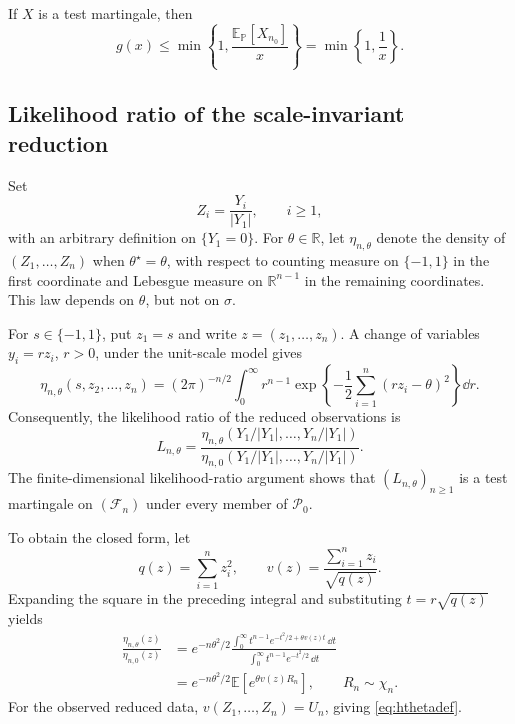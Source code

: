 If \(X\) is a test martingale, then
\[
  g(x)
  \leq
  \min\left\{
    1,
    \frac{\mathbb E_{\mathbb P}[X_{n_0}]}{x}
  \right\}
  =
  \min\left\{1,\frac1x\right\}.
\]


\subsection{Likelihood ratio of the scale-invariant reduction}
\label{app:invariant-likelihood}

Set
\[
  Z_i=\frac{Y_i}{|Y_1|},
  \qquad i\geq1,
\]
with an arbitrary definition on \(\{Y_1=0\}\). For
\(\theta\in\mathbb R\), let \(\eta_{n,\theta}\) denote the density of
\((Z_1,\ldots,Z_n)\) when \(\theta^\star=\theta\), with respect to
counting measure on \(\{-1,1\}\) in the first coordinate and Lebesgue
measure on \(\mathbb R^{n-1}\) in the remaining coordinates. This law
depends on \(\theta\), but not on \(\sigma\).

For \(s\in\{-1,1\}\), put \(z_1=s\) and write
\(z=(z_1,\ldots,z_n)\). A change of variables
\(y_i=r z_i\), \(r>0\), under the unit-scale model gives
\[
  \eta_{n,\theta}(s,z_2,\ldots,z_n)
  =
  (2\pi)^{-n/2}
  \int_0^\infty
  r^{n-1}
  \exp\left\{
    -\frac12\sum_{i=1}^n(rz_i-\theta)^2
  \right\}
  \dd r.
\]
Consequently, the likelihood ratio of the reduced observations is
\begin{equation}
\label{eq:scale-inv-LR}
  L_{n,\theta}
  =
  \frac{
    \eta_{n,\theta}
    \left(
      Y_1/|Y_1|,\ldots,Y_n/|Y_1|
    \right)
  }{
    \eta_{n,0}
    \left(
      Y_1/|Y_1|,\ldots,Y_n/|Y_1|
    \right)
  }.
\end{equation}
The finite-dimensional likelihood-ratio argument shows that
\((L_{n,\theta})_{n\geq1}\) is a test martingale on
\((\mathcal F_n)\) under every member of \(\mathcal P_0\).

To obtain the closed form, let
\[
  q(z)=\sum_{i=1}^n z_i^2,
  \qquad
  v(z)=\frac{\sum_{i=1}^n z_i}{\sqrt{q(z)}}.
\]
Expanding the square in the preceding integral and substituting
\(t=r\sqrt{q(z)}\) yields
\begin{align*}
  \frac{\eta_{n,\theta}(z)}{\eta_{n,0}(z)}
  &=
  e^{-n\theta^2/2}
  \frac{
    \int_0^\infty
    t^{n-1}e^{-t^2/2+\theta v(z)t}\,\dd t
  }{
    \int_0^\infty
    t^{n-1}e^{-t^2/2}\,\dd t
  }\\
  &=
  e^{-n\theta^2/2}
  \mathbb E\!\left[e^{\theta v(z)R_n}\right],
  \qquad R_n\sim\chi_n.
\end{align*}
For the observed reduced data, \(v(Z_1,\ldots,Z_n)=U_n\), giving
\eqref{eq:hthetadef}.


